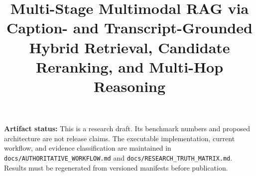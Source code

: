 \documentclass[conference]{IEEEtran}
\begin{document}
\title{Multi-Stage Multimodal RAG via Caption- and Transcript-Grounded Hybrid Retrieval, Candidate Reranking, and Multi-Hop Reasoning}

\author{
}

\maketitle

\begin{center}
\footnotesize\textbf{Artifact status:} This is a research draft. Its benchmark
numbers and proposed architecture are not release claims. The executable
implementation, current workflow, and evidence classification are maintained
in \texttt{docs/AUTHORITATIVE\_WORKFLOW.md} and
\texttt{docs/RESEARCH\_TRUTH\_MATRIX.md}. Results must be regenerated from
versioned manifests before publication.
\end{center}
\end{document}
